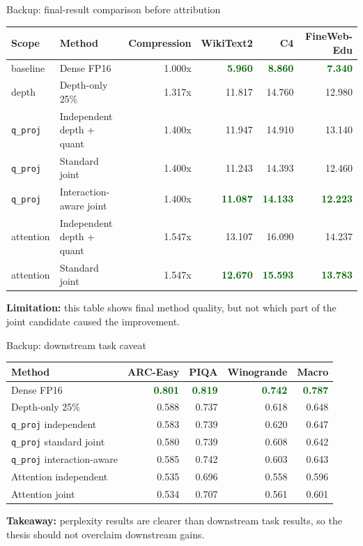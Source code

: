 \documentclass[aspectratio=169]{beamer}
\newcommand{\good}[1]{\textcolor{darkgreen}{\textbf{#1}}}
\begin{document}

\begin{frame}{Backup: final-result comparison before attribution}
\small
\begin{table}
\centering
\begin{tabular}{llrrrr}
\toprule
Scope & Method & Compression & WikiText2 & C4 & FineWeb-Edu \\
\midrule
baseline & Dense FP16 & 1.000x & \good{5.960} & \good{8.860} & \good{7.340} \\
depth & Depth-only 25\% & 1.317x & 11.817 & 14.760 & 12.980 \\
\texttt{q\_proj} & Independent depth + quant & 1.400x & 11.947 & 14.910 & 13.140 \\
\texttt{q\_proj} & Standard joint & 1.400x & 11.243 & 14.393 & 12.460 \\
\texttt{q\_proj} & Interaction-aware joint & 1.400x & \good{11.087} & \good{14.133} & \good{12.223} \\
attention & Independent depth + quant & 1.547x & 13.107 & 16.090 & 14.237 \\
attention & Standard joint & 1.547x & \good{12.670} & \good{15.593} & \good{13.783} \\
\bottomrule
\end{tabular}
\end{table}

\vspace{0.1cm}
\textbf{Limitation:} this table shows final method quality, but not which part of the joint candidate caused the improvement.
\end{frame}


\begin{frame}{Backup: downstream task caveat}
\small
\begin{table}
\centering
\begin{tabular}{lrrrr}
\toprule
Method & ARC-Easy & PIQA & Winogrande & Macro \\
\midrule
Dense FP16 & \good{0.801} & \good{0.819} & \good{0.742} & \good{0.787} \\
Depth-only 25\% & 0.588 & 0.737 & 0.618 & 0.648 \\
\texttt{q\_proj} independent & 0.583 & 0.739 & 0.620 & 0.647 \\
\texttt{q\_proj} standard joint & 0.580 & 0.739 & 0.608 & 0.642 \\
\texttt{q\_proj} interaction-aware & 0.585 & 0.742 & 0.603 & 0.643 \\
Attention independent & 0.535 & 0.696 & 0.558 & 0.596 \\
Attention joint & 0.534 & 0.707 & 0.561 & 0.601 \\
\bottomrule
\end{tabular}
\end{table}

\vspace{0.1cm}
\textbf{Takeaway:} perplexity results are clearer than downstream task results, so the thesis should not overclaim downstream gains.
\end{frame}
\end{document}
